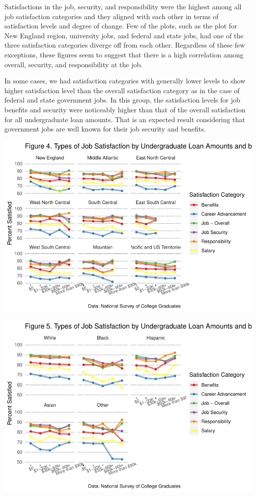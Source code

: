 \documentclass[]{article}
\begin{document}
Satisfactions in the job, security, and responsibility were the highest
among all job satisfaction categories and they aligned with each other
in terms of satisfaction levels and degree of change. Few of the plots,
such as the plot for New England region, university jobs, and federal
and state jobs, had one of the three satisfaction categories diverge off
from each other. Regardless of these few exceptions, these figures seem
to suggest that there is a high correlation among overall, security, and
responsibility at the job.

In some cases, we had satisfaction categories with generally lower
levels to show higher satisfaction level than the overall satisfaction
category as in the case of federal and state government jobs. In this
group, the satisfaction levels for job benefits and security were
noticeably higher than that of the overall satisfaction for all
undergraduate loan amounts. That is an expected result considering that
government jobs are well known for their job security and benefits.

\includegraphics{Report_Draft_04282019_files/figure-latex/unnamed-chunk-5-1.pdf}

\includegraphics{Report_Draft_04282019_files/figure-latex/unnamed-chunk-6-1.pdf}
\end{document}
